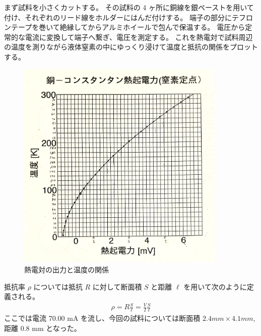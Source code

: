 \documentclass[uplatex,dvipdfmx,a4paper,11pt]{jlreq}
\numberwithin{equation}{section}
\theoremstyle{definition}
\begin{document}
まず試料を小さくカットする。
その試料の 4 ヶ所に銅線を銀ペーストを用いて付け、それぞれのリード線をホルダーにはんだ付けする。
端子の部分にテフロンテープを巻いて絶縁してからアルミホイールで包んで保温する。
電圧から定常的な電流に変換して端子へ繋ぎ、電圧を測定する。
これを熱電対で試料周辺の温度を測りながら液体窒素の中にゆっくり浸けて温度と抵抗の関係をプロットする。

\begin{figure}[htbp]
  \centering
  \includegraphics[width=10cm]{./assets/YBCO_thermocouple.jpg}
  \caption{熱電対の出力と温度の関係}
  \label{fig:thermo}
\end{figure}
抵抗率 $\rho$ については抵抗 $R$ に対して断面積 $S$ と距離 $\ell$ を用いて次のように定義される。
\begin{align}
  \rho = R\frac{S}{\ell} = \frac{V}{I}\frac{S}{\ell}
\end{align}
ここでは電流 70.00 \si{mA} を流し、今回の試料については断面積 $2.4\si{mm} \times 4.1\si{mm}$, 距離 0.8 \si{mm} となった。
\end{document}
